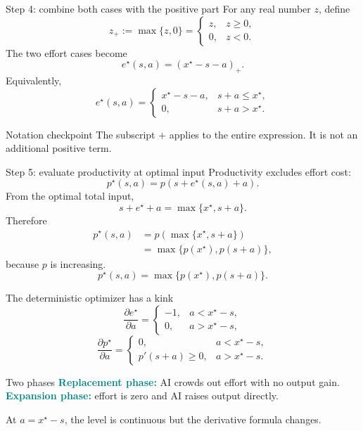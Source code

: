 \documentclass[aspectratio=169,10pt]{beamer}
\newcommand{\pos}[1]{\left(#1\right)_{+}}
\newcommand{\key}[1]{\textcolor{teal}{\textbf{#1}}}
\begin{document}
\begin{frame}{Step 4: combine both cases with the positive part}
For any real number $z$, define
\[
z_+:=\max\{z,0\}
=
\begin{cases}
z,&z\ge0,\\
0,&z<0.
\end{cases}
\]
The two effort cases become
\[
\boxed{e^\star(s,a)=\pos{x^\star-s-a}.}
\]
Equivalently,
\[
e^\star(s,a)=
\begin{cases}
x^\star-s-a,&s+a\le x^\star,\\
0,&s+a>x^\star.
\end{cases}
\]
\begin{exampleblock}{Notation checkpoint}
The subscript $+$ applies to the entire expression. It is not an additional positive term.
\end{exampleblock}
\end{frame}

\begin{frame}{Step 5: evaluate productivity at optimal input}
Productivity excludes effort cost:
\[
p^\star(s,a)=p(s+e^\star(s,a)+a).
\]
From the optimal total input,
\[
s+e^\star+a=\max\{x^\star,s+a\}.
\]
Therefore
\begin{align*}
p^\star(s,a)
&=p\!\left(\max\{x^\star,s+a\}\right)\\
&=\max\{p(x^\star),p(s+a)\},
\end{align*}
because $p$ is increasing.
\[
\boxed{p^\star(s,a)=\max\{p(x^\star),p(s+a)\}.}
\]
\end{frame}

\begin{frame}{The deterministic optimizer has a kink}
\[
\frac{\partial e^\star}{\partial a}
=
\begin{cases}
-1,&a<x^\star-s,\\
0,&a>x^\star-s,
\end{cases}
\]
\[
\frac{\partial p^\star}{\partial a}
=
\begin{cases}
0,&a<x^\star-s,\\
p'(s+a)\ge0,&a>x^\star-s.
\end{cases}
\]
\begin{block}{Two phases}
\key{Replacement phase:} AI crowds out effort with no output gain.\\[1mm]
\key{Expansion phase:} effort is zero and AI raises output directly.
\end{block}
\vspace{2mm}
At $a=x^\star-s$, the level is continuous but the derivative formula changes.
\end{frame}
\end{document}

